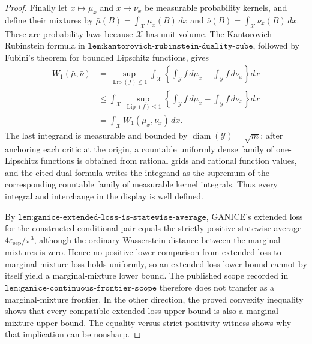 \documentclass{article}
\begin{document}
\begin{proof}
Finally let \(x\mapsto\mu_x\) and \(x\mapsto\nu_x\) be measurable probability kernels, and define their mixtures by \(\bar\mu(B)=\int_{\mathcal X}\mu_x(B)\,dx\) and \(\bar\nu(B)=\int_{\mathcal X}\nu_x(B)\,dx\).  These are probability laws because \(\mathcal X\) has unit volume.  The Kantorovich--Rubinstein formula in \(\texttt{lem:kantorovich-rubinstein-duality-cube}\), followed by Fubini's theorem for bounded Lipschitz functions, gives
\[
\begin{aligned}
W_1(\bar\mu,\bar\nu)
&=\sup_{\operatorname{Lip}(f)\le1}
  \int_{\mathcal X}\left\{\int_{\mathcal Y}f\,d\mu_x-
  \int_{\mathcal Y}f\,d\nu_x\right\}dx\\
&\le\int_{\mathcal X}\sup_{\operatorname{Lip}(f)\le1}
 \left\{\int_{\mathcal Y}f\,d\mu_x-
 \int_{\mathcal Y}f\,d\nu_x\right\}dx\\
&=\int_{\mathcal X}W_1(\mu_x,\nu_x)\,dx.
\end{aligned}
\]
The last integrand is measurable and bounded by \(\operatorname{diam}(\mathcal Y)=\sqrt m\): after anchoring each critic at the origin, a countable uniformly dense family of one-Lipschitz functions is obtained from rational grids and rational function values, and the cited dual formula writes the integrand as the supremum of the corresponding countable family of measurable kernel integrals.  Thus every integral and interchange in the display is well defined.

By \(\texttt{lem:ganice-extended-loss-is-statewise-average}\), GANICE's extended loss for the constructed conditional pair equals the strictly positive statewise average \(4\varepsilon_{\mathrm{sep}}/\pi^3\), although the ordinary Wasserstein distance between the marginal mixtures is zero.  Hence no positive lower comparison from extended loss to marginal-mixture loss holds uniformly, so an extended-loss lower bound cannot by itself yield a marginal-mixture lower bound.  The published scope recorded in \(\texttt{lem:ganice-continuous-frontier-scope}\) therefore does not transfer as a marginal-mixture frontier.  In the other direction, the proved convexity inequality shows that every compatible extended-loss upper bound is also a marginal-mixture upper bound.  The equality-versus-strict-positivity witness shows why that implication can be nonsharp.
\end{proof}
\end{document}
